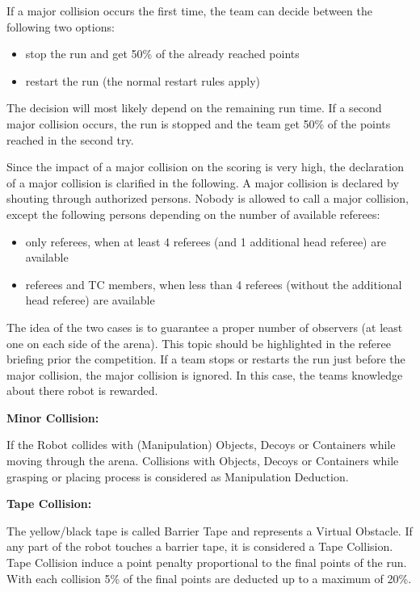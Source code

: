 If a major collision occurs the first time, the team can decide between the following two options:
\begin{itemize}
	\item stop the run and get 50\% of the already reached points
	\item restart the run (the normal restart rules apply)
\end{itemize}
The decision will most likely depend on the remaining run time. If a second major collision occurs, the run is stopped and the team get 50\% of the points reached in the second try.


Since the impact of a major collision on the scoring is very high, the declaration of a major collision is clarified in the following. A major collision is declared by shouting through authorized persons. Nobody is allowed to call a major collision, except the following persons depending on the number of available referees:
\begin{itemize}
	\item only referees, when at least 4 referees (and 1 additional head referee) are available
	\item referees and TC members, when less than 4 referees (without the additional head referee) are available
\end{itemize}
The idea of the two cases is to guarantee a proper number of observers (at least one on each side of the arena). This topic should be highlighted in the referee briefing prior the competition. If a team stops or restarts the run just before the major collision, the major collision is ignored. In this case, the teams knowledge about there robot is rewarded.


\textbf{Minor Collision:}

If the Robot collides with (Manipulation) Objects, Decoys or Containers while moving through the arena. Collisions with Objects, Decoys or Containers while grasping or placing process is considered as Manipulation Deduction.


\textbf{Tape Collision:}

The yellow/black tape is called Barrier Tape and represents a Virtual Obstacle. If any part of the robot
touches a barrier tape, it is considered a Tape Collision. Tape Collision induce a point penalty
proportional to the final points of the run. With each collision 5\% of the final points are deducted up to a maximum
of 20\%. 

